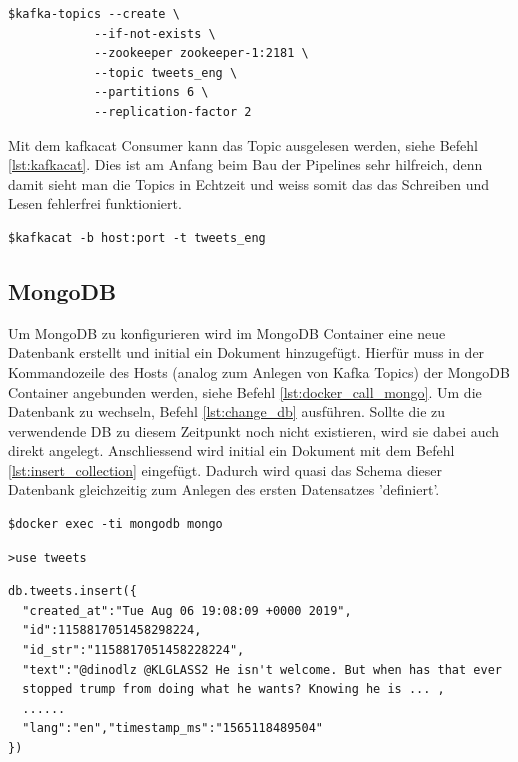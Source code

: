 \begin{lstlisting}[float=h,frame=tb,caption={Befehl um Kafka Topic zu erstellen},label=lst:kafka_create]
		$kafka-topics --create \
			--if-not-exists \
			--zookeeper zookeeper-1:2181 \
			--topic tweets_eng \
			--partitions 6 \
			--replication-factor 2
\end{lstlisting}

Mit dem kafkacat Consumer kann das Topic ausgelesen werden, siehe Befehl \ref{lst:kafkacat}. Dies ist am Anfang beim Bau der Pipelines sehr hilfreich, denn damit sieht man die Topics in Echtzeit und weiss somit das das Schreiben und Lesen fehlerfrei funktioniert. 

\begin{lstlisting}[float=h,frame=tb,caption={Befehl um Kafka Nachrichten zu sehen},label=lst:kafkacat]
		$kafkacat -b host:port -t tweets_eng
\end{lstlisting}

\subsection{MongoDB}
Um MongoDB zu konfigurieren wird im MongoDB Container eine neue Datenbank erstellt und initial ein Dokument hinzugef{\"u}gt. Hierf{\"u}r muss in der Kommandozeile des Hosts (analog zum Anlegen von Kafka Topics) der MongoDB Container angebunden werden, siehe Befehl \ref{lst:docker_call_mongo}. Um die Datenbank zu wechseln, Befehl \ref{lst:change_db} ausf{\"u}hren. Sollte die zu verwendende DB zu diesem Zeitpunkt noch nicht existieren, wird sie dabei auch direkt angelegt. Anschliessend wird initial ein Dokument mit dem Befehl \ref{lst:insert_collection} eingef{\"u}gt. Dadurch wird quasi das Schema dieser Datenbank gleichzeitig zum Anlegen des ersten Datensatzes 'definiert'. 

\begin{lstlisting}[float=h,frame=tb,caption={Befehl um MongoDB shell zu starten},label=lst:docker_call_mongo]
		$docker exec -ti mongodb mongo
\end{lstlisting}

\begin{lstlisting}[float=h,frame=tb,caption={Befehl um zur tweets Datenbank zu wecheln},label=lst:change_db]
		>use tweets
\end{lstlisting}

\begin{lstlisting}[float=h,frame=tb,caption={Befehl um Tweet Dokumente in  Tweets Collection zu schreiben},label=lst:insert_collection]
db.tweets.insert({
  "created_at":"Tue Aug 06 19:08:09 +0000 2019",
  "id":1158817051458298224,
  "id_str":"1158817051458228224",
  "text":"@dinodlz @KLGLASS2 He isn't welcome. But when has that ever 
  stopped trump from doing what he wants? Knowing he is ... ,
  ......
  "lang":"en","timestamp_ms":"1565118489504"
})
\end{lstlisting}

